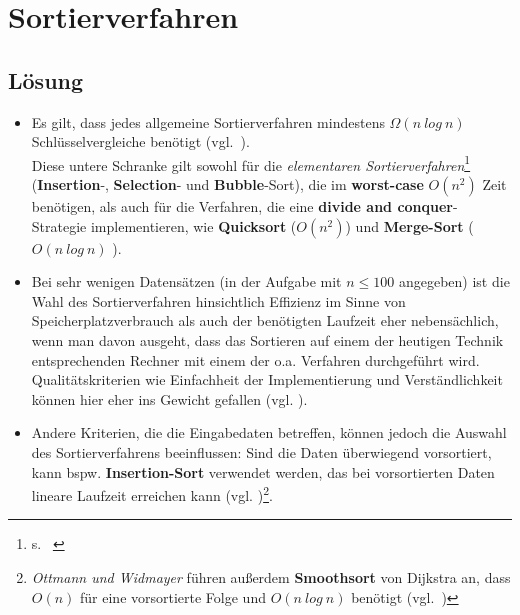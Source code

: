 \chapter{Sortierverfahren}

\section{Lösung}

\begin{itemize}
    \item Es gilt, dass jedes allgemeine Sortierverfahren mindestens $\Omega(n\ log\ n)$ Schlüsselvergleiche benötigt (vgl.~\cite[154]{OW17b}).\\
    Diese untere Schranke gilt sowohl für die \textit{elementaren Sortierverfahren}\footnote{s. ~\cite[81]{OW17b}}  (\textbf{Insertion}-,
    \textbf{Selection}- und \textbf{Bubble}-Sort), die im \textbf{worst-case} $O(n^2)$ Zeit benötigen, als auch für die
    Verfahren, die eine \textbf{divide and conquer}-Strategie implementieren, wie \textbf{Quicksort} ($O(n^2)$)
    und \textbf{Merge-Sort} ($O(n\ log\ n)$ ).

    \item Bei sehr wenigen Datensätzen (in der Aufgabe mit $n \leq 100$ angegeben) ist die Wahl des Sortierverfahren
    hinsichtlich Effizienz im Sinne von Speicherplatzverbrauch als auch der benötigten Laufzeit eher nebensächlich, wenn man davon ausgeht,
    dass das Sortieren auf einem der heutigen Technik entsprechenden Rechner mit einem der o.a. Verfahren durchgeführt wird.\\
    Qualitätskriterien wie Einfachheit der Implementierung und Verständlichkeit können hier eher ins Gewicht gefallen (vgl. \cite[5 f.]{GD18a}).

    \item Andere Kriterien, die die Eingabedaten betreffen, können jedoch die Auswahl des Sortierverfahrens beeinflussen: Sind die Daten überwiegend
    vorsortiert, kann bspw. \textbf{Insertion-Sort} verwendet werden, das bei vorsortierten Daten lineare Laufzeit erreichen kann (vgl. \cite[188]{CL22})\footnote{
        \textit{Ottmann und Widmayer} führen außerdem \textbf{Smoothsort} von Dijkstra an, dass $O(n)$ für eine vorsortierte Folge und $O(n\ log\ n)$ benötigt (vgl.~\cite[112]{OW17b})
        }.


\end{itemize}
